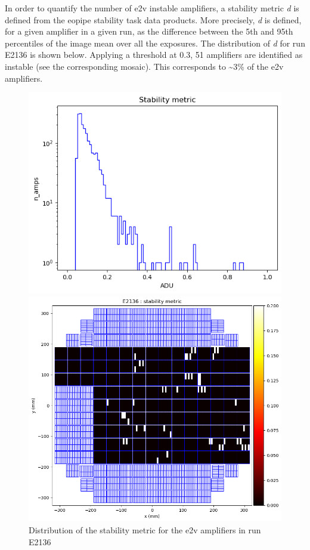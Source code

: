 In order to quantify the number of e2v instable amplifiers, a stability
metric \emph{d} is defined from the eo\label{pipe}{pipe}
stability task data products. More precisely, \emph{d} is defined, for a
given amplifier in a given run, as the difference between the 5th and
95th percentiles of the image mean over all the exposures. The
distribution of \emph{d} for run E2136 is shown below. Applying a
threshold at 0.3, 51 amplifiers are identified as instable (see the
corresponding mosaic). This corresponds to \textasciitilde3\% of the e2v
amplifiers.

\begin{figure}[htbp]
\centering
\begin{minipage}{0.45\textwidth}
    \centering
    \includegraphics[width=\textwidth]{sections/figures/E2136_distribution_d.png}
    \caption{Distribution of the stability metric for the e2v amplifiers in run E2136}
\end{minipage}
\hfill
\begin{minipage}{0.45\textwidth}
    \centering
    \includegraphics[width=\textwidth]{sections/figures/E2136_mosaic_d.png}

\end{minipage}
\end{figure}
